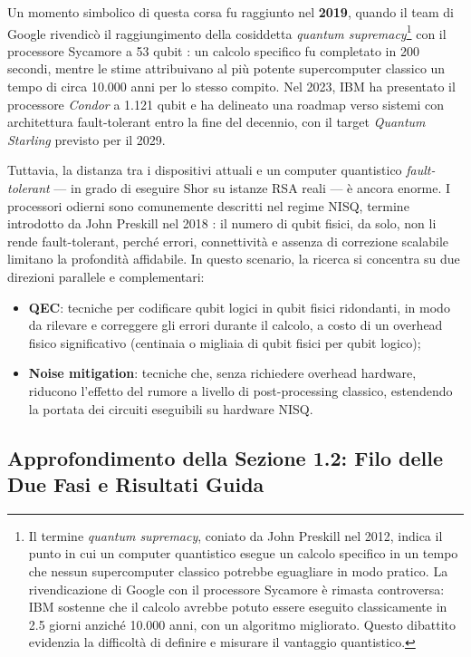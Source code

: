 \begin{onehalfspace}
Un momento simbolico di questa corsa fu raggiunto nel \textbf{2019}, quando il team di Google rivendicò il raggiungimento della cosiddetta \textit{quantum supremacy}\footnote{Il termine \textit{quantum supremacy}, coniato da John Preskill nel 2012, indica il punto in cui un computer quantistico esegue un calcolo specifico in un tempo che nessun supercomputer classico potrebbe eguagliare in modo pratico. La rivendicazione di Google con il processore Sycamore è rimasta controversa: IBM sostenne che il calcolo avrebbe potuto essere eseguito classicamente in 2.5 giorni anziché 10.000 anni, con un algoritmo migliorato. Questo dibattito evidenzia la difficoltà di definire e misurare il vantaggio quantistico.} con il processore Sycamore a 53 qubit \cite{arute2019}: un calcolo specifico fu completato in 200 secondi, mentre le stime attribuivano al più potente supercomputer classico un tempo di circa 10.000 anni per lo stesso compito. Nel 2023, IBM ha presentato il processore \textit{Condor} a 1.121 qubit e ha delineato una roadmap \cite{ibm_roadmap2025} verso sistemi con architettura fault-tolerant entro la fine del decennio, con il target \textit{Quantum Starling} previsto per il 2029.

Tuttavia, la distanza tra i dispositivi attuali e un computer quantistico \textit{fault-tolerant} --- in grado di eseguire Shor su istanze RSA reali --- è ancora enorme. I processori odierni sono comunemente descritti nel regime \ac{NISQ}, termine introdotto da John Preskill nel 2018 \cite{preskill2018}: il numero di qubit fisici, da solo, non li rende fault-tolerant, perché errori, connettività e assenza di correzione scalabile limitano la profondità affidabile. In questo scenario, la ricerca si concentra su due direzioni parallele e complementari:

\begin{itemize}
    \item \textbf{\ac{QEC}}: tecniche per codificare qubit logici in qubit fisici ridondanti, in modo da rilevare e correggere gli errori durante il calcolo, a costo di un overhead fisico significativo (centinaia o migliaia di qubit fisici per qubit logico);

    \item \textbf{Noise mitigation}: tecniche che, senza richiedere overhead hardware, riducono l'effetto del rumore a livello di post-processing classico, estendendo la portata dei circuiti eseguibili su hardware NISQ.
\end{itemize}

\subsection{Approfondimento della Sezione 1.2: Filo delle Due Fasi e Risultati Guida}
\label{app:intro:filo}


\end{onehalfspace}
